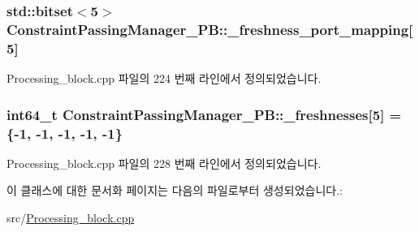 \subsubsection[{\texorpdfstring{\+\_\+freshness\+\_\+port\+\_\+mapping}{_freshness_port_mapping}}]{\setlength{\rightskip}{0pt plus 5cm}std\+::bitset$<$5$>$ Constraint\+Passing\+Manager\+\_\+\+P\+B\+::\+\_\+freshness\+\_\+port\+\_\+mapping\mbox{[}5\mbox{]}\hspace{0.3cm}{\ttfamily [private]}}\hypertarget{classConstraintPassingManager__PB_a34c12f7a79cb6c7a6c68bf63e17fed65}{}\label{classConstraintPassingManager__PB_a34c12f7a79cb6c7a6c68bf63e17fed65}


Processing\+\_\+block.\+cpp 파일의 224 번째 라인에서 정의되었습니다.

\subsubsection[{\texorpdfstring{\+\_\+freshnesses}{_freshnesses}}]{\setlength{\rightskip}{0pt plus 5cm}int64\+\_\+t Constraint\+Passing\+Manager\+\_\+\+P\+B\+::\+\_\+freshnesses\mbox{[}5\mbox{]} = \{-\/1, -\/1, -\/1, -\/1, -\/1\}\hspace{0.3cm}{\ttfamily [private]}}\hypertarget{classConstraintPassingManager__PB_ab06613fe88e472ed575a09e32d60bf67}{}\label{classConstraintPassingManager__PB_ab06613fe88e472ed575a09e32d60bf67}


Processing\+\_\+block.\+cpp 파일의 228 번째 라인에서 정의되었습니다.



이 클래스에 대한 문서화 페이지는 다음의 파일로부터 생성되었습니다.\+:\begin{DoxyCompactItemize}
\item 
src/\hyperlink{Processing__block_8cpp}{Processing\+\_\+block.\+cpp}\end{DoxyCompactItemize}
